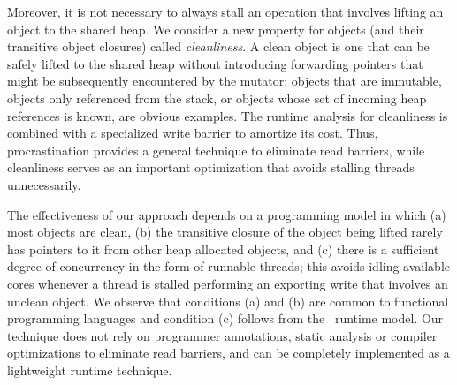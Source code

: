 Moreover, it is not necessary to always stall an operation that involves
lifting an object to the shared heap.  We consider a new property for objects
(and their transitive object closures) called \emph{cleanliness}.  A clean
object is one that can be safely lifted to the shared heap without introducing
forwarding pointers that might be subsequently encountered by the mutator:
objects that are immutable, objects only referenced from the stack, or objects
whose set of incoming heap references is known, are obvious examples.  The
runtime analysis for cleanliness is combined with a specialized write barrier
to amortize its cost.  Thus, procrastination provides a general technique to
eliminate read barriers, while cleanliness serves as an important optimization
that avoids stalling threads unnecessarily.

The effectiveness of our approach depends on a programming model in which (a)
most objects are clean, (b) the transitive closure of the object being lifted
rarely has pointers to it from other heap allocated objects, and (c) there is a
sufficient degree of concurrency in the form of runnable threads; this avoids
idling available cores whenever a thread is stalled performing an exporting
write that involves an unclean object.  We observe that conditions (a) and (b)
are common to functional programming languages and condition (c) follows from
the \acml\ runtime model. Our technique does not rely on programmer
annotations, static analysis or compiler optimizations to eliminate read
barriers, and can be completely implemented as a lightweight runtime technique.

